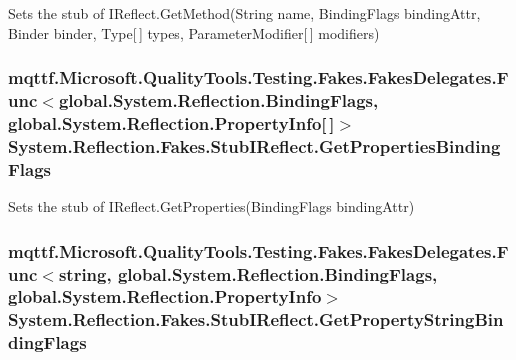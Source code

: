 Sets the stub of I\-Reflect.\-Get\-Method(\-String name, Binding\-Flags binding\-Attr, Binder binder, Type\mbox{[}$\,$\mbox{]} types, Parameter\-Modifier\mbox{[}$\,$\mbox{]} modifiers)

\hypertarget{class_system_1_1_reflection_1_1_fakes_1_1_stub_i_reflect_ace8c1837feeaa3fa05c79c4b48091e82}{
\subsubsection[{Get\-Properties\-Binding\-Flags}]{\setlength{\rightskip}{0pt plus 5cm}mqttf.\-Microsoft.\-Quality\-Tools.\-Testing.\-Fakes.\-Fakes\-Delegates.\-Func$<$global.\-System.\-Reflection.\-Binding\-Flags, global.\-System.\-Reflection.\-Property\-Info\mbox{[}$\,$\mbox{]}$>$ System.\-Reflection.\-Fakes.\-Stub\-I\-Reflect.\-Get\-Properties\-Binding\-Flags}}\label{class_system_1_1_reflection_1_1_fakes_1_1_stub_i_reflect_ace8c1837feeaa3fa05c79c4b48091e82}


Sets the stub of I\-Reflect.\-Get\-Properties(\-Binding\-Flags binding\-Attr)

\hypertarget{class_system_1_1_reflection_1_1_fakes_1_1_stub_i_reflect_a2853f533fb9dfc54eb5db43c9e7e2b47}{
\subsubsection[{Get\-Property\-String\-Binding\-Flags}]{\setlength{\rightskip}{0pt plus 5cm}mqttf.\-Microsoft.\-Quality\-Tools.\-Testing.\-Fakes.\-Fakes\-Delegates.\-Func$<$string, global.\-System.\-Reflection.\-Binding\-Flags, global.\-System.\-Reflection.\-Property\-Info$>$ System.\-Reflection.\-Fakes.\-Stub\-I\-Reflect.\-Get\-Property\-String\-Binding\-Flags}}\label{class_system_1_1_reflection_1_1_fakes_1_1_stub_i_reflect_a2853f533fb9dfc54eb5db43c9e7e2b47}


